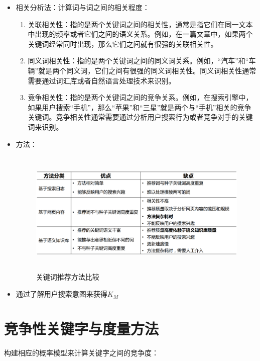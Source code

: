 \documentclass[12pt, a4paper, oneside]{ctexbook}
\begin{document}
\begin{itemize}
    \item 相关分析法：计算词与词之间的相关程度：

    \begin{enumerate}
        \item 关联相关性：指的是两个关键词之间的相关性，通常是指它们在同一文本中出现的频率或者它们之间的语义关系。例如，在一篇文章中，如果两个关键词经常同时出现，那么它们之间就有很强的关联相关性。
        \item 同义词相关性：指的是两个关键词之间的同义词关系。例如，“汽车”和“车辆”就是两个同义词，它们之间有很强的同义词相关性。同义词相关性通常需要通过词汇库或者自然语言处理技术来识别。
        \item 竞争相关性：指的是两个关键词之间的竞争关系。例如，在搜索引擎中，如果用户搜索“手机”，那么“苹果”和“三星”就是两个与“手机”相关的竞争关键词。竞争相关性通常需要通过分析用户搜索行为或者竞争对手的关键词来识别。
    \end{enumerate}

    \item 方法：
    \begin{figure}[htbp]
        \centering
        \includegraphics[height = 6cm, width = 15cm]{方法.png}
        \caption{关键词推荐方法比较}
        \label{fig:example}
    \end{figure}

    \item 通过了解用户搜索意图来获得$ K_M $
\end{itemize}

\section{竞争性关键字与度量方法}
构建相应的概率模型来计算关键字之间的竞争度：
\vspace{20pt}
\end{document}
